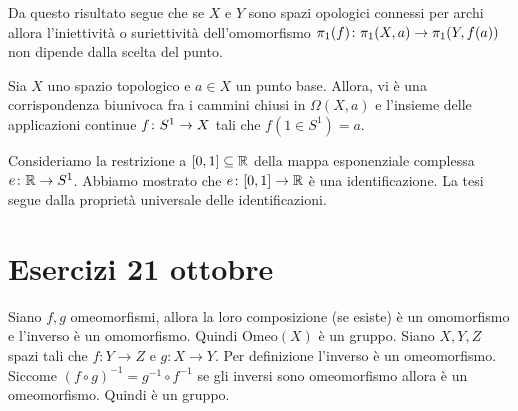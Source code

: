 \documentclass[a4paper]{article}
\begin{document}
Da questo risultato segue che se \(X\) e \(Y\) sono spazi opologici connessi per archi
allora l'iniettività o suriettività dell'omomorfismo \(\pi_1(f) \colon \pi_1(X, a) \to \pi_1(Y, f(a))\)
non dipende dalla scelta del punto.

\begin{snippetproposition}{}
    Sia \(X\) uno spazio topologico e \(a \in X\) un punto base.
    Allora, vi è una corrispondenza biunivoca fra
    i cammini chiusi in \(\Omega(X, a)\) e l'insieme
    delle applicazioni continue \(f \colon S^1 \to X\) tali che \(f(1 \in S^1) = a\).
\end{snippetproposition}

\begin{snippetproof}{}
    Consideriamo la restrizione a \([0,1] \subseteq \mathbb{R}\)
    della mappa esponenziale complessa \(e \colon \mathbb{R} \to S^1\).
    Abbiamo mostrato che \(e \colon [0,1] \to \mathbb{R}\) è una identificazione.
    La tesi segue dalla proprietà universale delle identificazioni.
    \begin{center}
    \end{center}
\end{snippetproof}

\pagebreak

\section{Esercizi 21 ottobre}

\begin{snippetexercise}{}
    Siano \(f,g\) omeomorfismi, allora la loro composizione (se esiste)
    è un omomorfismo e l'inverso è un omomorfismo. Quindi \(\text{Omeo}(X)\) è un gruppo.
    Siano \(X,Y,Z\) spazi tali che \(f\colon Y \to Z\) e \(g \colon X \to Y\).
    Per definizione l'inverso è un omeomorfismo.
    Siccome \((f \circ g)^{-1} = g^{-1} \circ f^{-1}\) se gli inversi sono omeomorfismo allora è un omeomorfismo.
    Quindi è un gruppo.
\end{snippetexercise}
\end{document}
